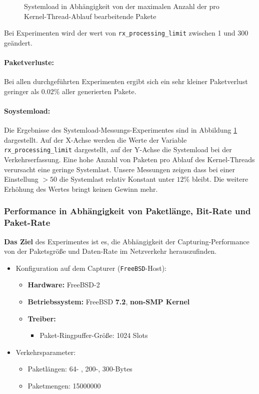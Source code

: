 {\begin{figure}
\caption{Systemload in Abhängigkeit von der maximalen Anzahl der pro Kernel-Thread-Ablauf
bearbeitende Pakete}
\label{img:plot_sysload_kts}
\end{figure} 
Bei Experimenten wird der wert von \verb+rx_processing_limit+ zwischen 1 und 300 
geändert.
\paragraph*{Paketverluste:} 
Bei allen durchgeführten Experimenten ergibt sich ein sehr kleiner Paketverlust
geringer als $0.02\%$ aller generierten Pakete.
\paragraph*{Soystemload:}
Die Ergebnisse des Systemload-Messungs-Experimentes sind in Abbildung
\ref{img:plot_sysload_kts} dargestellt.  Auf der X-Achse werden die Werte der
Variable \verb+rx_processing_limit+ dargestellt, auf der Y-Achse die Systemload
bei der Verkehrserfassung. Eine hohe Anzahl von Paketen pro Ablauf des
Kernel-Threads verursacht eine geringe Systemlast. Unsere Messungen zeigen dass
bei einer Einstellung $>50$ die Systemlast relativ Konstant unter $12\%$ bleibt. 
Die weitere Erhöhung des Wertes bringt keinen Gewinn mehr.
}
\subsubsection*{Performance in Abhängigkeit von Paketlänge, Bit-Rate und Paket-Rate}
\textbf{Das Ziel} des Experimentes ist es, die Abhängigkeit der
Capturing-Performance von der Paketsgröße und Daten-Rate im Netzverkehr
herauszufinden.
%
\begin{itemize}
\item Konfiguration auf dem Capturer (\verb+FreeBSD+-Host): 
\begin{itemize}
	\item \textbf{Hardware:} FreeBSD-2
	\item \textbf{Betriebssystem:} FreeBSD \textbf{7.2}, \textbf{non-SMP Kernel}
	\item \textbf{Treiber:} 
		\begin{itemize}
			\item Paket-Ringpuffer-Größe: 1024 Slots
		\end{itemize}
\end{itemize}
\item Verkehrsparameter:
\begin{itemize}
	\item Paketlängen: 64- , 200-, 300-Bytes
	\item Paketmengen: 15000000
\end{itemize}
\end{itemize}
%

